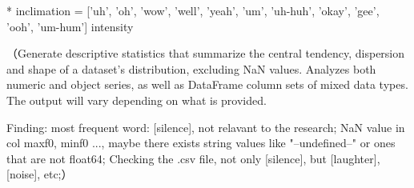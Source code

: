 * inclimation = ['uh', 'oh', 'wow', 'well', 'yeah', 'um', 'uh-huh', 'okay', 'gee', 'ooh', 'um-hum']
intensity


（Generate descriptive statistics that summarize the central tendency, dispersion and shape of a dataset's distribution, excluding NaN values.
Analyzes both numeric and object series, as well as DataFrame column sets of mixed data types. The output will vary depending on what is provided.

Finding:
most frequent word: [silence], not relavant to the research;
NaN value in col maxf0, minf0 ..., maybe there exists string values like "--undefined--" or ones that are not float64;
Checking the .csv file, not only [silence], but [laughter], [noise], etc;）





